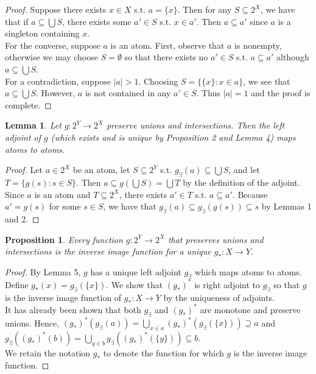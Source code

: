 \documentclass{article}
\newtheorem{proposition}{Proposition}
\newtheorem{lemma}{Lemma}
\begin{document}
\begin{proof}
Suppose there exists $x \in X$ s.t. $a = \{x\}$. Then for any $S \subseteq 2^X$, we have that if $a \subseteq \bigcup S$, there exists some $a' \in S$ s.t. $x \in a'$. Then $a \subseteq a'$ since $a$ is a singleton containing $x$. \\ 

For the converse, suppose $a$ is an atom. First, observe that $a$ is nonempty, otherwise we may choose $S = \emptyset$ so that there exists no $a' \in S$ s.t. $a \subseteq a'$ although $a \subseteq \bigcup S$. \\

For a contradiction, suppose $|a| > 1$. Choosing $S = \{\{x\} : x \in a\}$, we see that $a \subseteq \bigcup S$. However, $a$ is not contained in any $a' \in S$. Thus $|a| = 1$ and the proof is complete.
\end{proof}

\begin{lemma}Let $g : 2^Y \to 2^X$ preserve unions and intersections. Then the left adjoint of $g$ (which exists and is unique by Proposition 2 and Lemma 4) maps atoms to atoms. 
\end{lemma}

\begin{proof}
Let $a \in 2^X$ be an atom, let $S \subseteq 2^Y$ s.t. $g_\exists(a) \subseteq \bigcup S$, and let $T = \{g(s) : s \in S\}$. Then $a \subseteq g(\bigcup S) = \bigcup T$ by the definition of the adjoint. Since $a$ is an atom and $T \subseteq 2^X$, there exists $a' \in T$ s.t. $a \subseteq a'$. Because $a' = g(s)$ for some $s \in S$, we have that $g_\exists(a) \subseteq g_\exists(g(s)) \subseteq s$ by Lemmas 1 and 2.
\end{proof}

\begin{proposition}
Every function $g : 2^Y \to 2^X$ that preserves unions and intersections is the inverse image function for a unique $g_* : X \to Y$. 
\end{proposition}

\begin{proof}
By Lemma 5, $g$ has a unique left adjoint $g_\exists$ which maps atoms to atoms. Define $g_*(x) = g_\exists(\{x\})$. We show that $(g_*)^*$ is right adjoint to $g_\exists$ so that $g$ is the inverse image function of $g_* : X \to Y$ by the uniqueness of adjoints. \\

It has already been shown that both $g_\exists$ and $(g_*)^*$ are monotone and preserve unions. Hence, $(g_*)^*(g_\exists(a)) = \bigcup_{x \in a} (g_*)^*(g_\exists(\{x\})) \supseteq a$ and $g_\exists((g_*)^*(b)) = \bigcup_{y \in b} g_\exists((g_*)^*(\{y\})) \subseteq b$. \\

We retain the notation $g_*$ to denote the function for which $g$ is the inverse image function. 
\end{proof}
\end{document}
